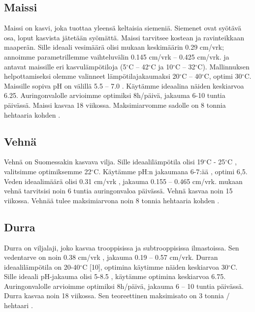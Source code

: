 \documentclass[12pt]{scrreprt}
\begin{document}
  \subsection{Maissi}

  Maissi on kasvi, joka tuottaa yleensä keltaisia siemeniä. Siemenet ovat
  syötävä osa, loput kasvista jätetään syömättä. Maissi tarvitsee kostean ja
  ravinteikkaan maaperän. Sille ideaali vesimäärä olisi \cite{cropwater} mukaan
  keskimäärin 0.29 cm/vrk; annoimme parametrillemme vaihteluvälin 0.145 cm/vrk
  – 0.425 cm/vrk. \cite{ugandamaize} ja \cite{plessismaize} antavat maissille
  eri kasvulämpötiloja (5$^{\circ}$C – 42$^{\circ}$C ja 10$^{\circ}$C –
  32$^{\circ}$C). Mallinnuksen helpottamiseksi olemme valinneet
  lämpötilajakaumaksi 20$^{\circ}$C – 40$^{\circ}$C, optimi 30$^{\circ}$C.
  Maissille sopiva pH on välillä 5.5 – 7.0 \cite{corngrowing}. Käytämme
  ideaalina näiden keskiarvoa 6.25. Auringonvalolle arvioimme optimiksi
  8h/päivä, jakauma 6-10 tuntia päivässä. Maissi kasvaa 18 viikossa.
  Maksimiarvomme sadolle on 8 tonnia hehtaaria kohden \cite{iita}.

  \subsection{Vehnä}

  Vehnä on Suomessakin kasvava vilja. Sille ideaalilämpötila olisi 19$^{\circ}$C
  - 25$^{\circ}$C \cite{wheat}, valitsimme optimiksemme 22$^{\circ}$C. Käytämme
  pH:n jakaumana 6-7:ää \cite{wheatfert}, optimi 6,5. Veden ideaalimäärä olisi
  0.31 cm/vrk \cite{cropwater}, jakauma  0.155 – 0.465 cm/vrk. \cite{growwheat}
  mukaan vehnä tarvitsisi noin 6 tuntia auringonvaloa päivässä. Vehnä kasvaa
  noin 15 viikossa. Vehnää tulee maksimiarvona noin 8 tonnia hehtaaria kohden
  \cite{sri}.

  \subsection{Durra}

  Durra on viljalaji, joko kasvaa trooppisissa ja subtrooppisissa ilmastoissa.
  Sen vedentarve on noin 0.38 cm/vrk \cite{cropwater}, jakauma 0.19 –
  0.57 cm/vrk. Durran ideaalilämpötila on 20-40$^{\circ}$C [10], optimina
  käytimme näiden keskiarvoa 30$^{\circ}$C. Sille ideaali pH-jakauma olisi 5-8.5
  \cite{moench}, käytämme optimina keskiarvoa 6.75. Auringonvalolle arvioimme
  optimiksi 8h/päivä, jakauma 6 – 10 tuntia päivässä. Durra kasvaa noin 18
  viikossa. Sen teoreettinen maksimisato on 3 tonnia / hehtaari \cite{wylie}.
\end{document}
